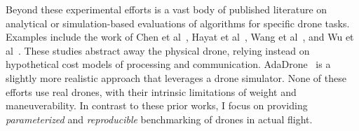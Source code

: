 Beyond these experimental efforts is a vast body of published
literature on analytical or simulation-based evaluations of algorithms
for specific drone tasks.  Examples include the work of Chen et
al~\cite{Chen2020}, Hayat et al~\cite{Hayat2021}, Wang et
al~\cite{Wang2020}, and Wu et al~\cite{Wu2020}.  These studies
abstract away the physical drone, relying instead on hypothetical cost
models of processing and communication.  AdaDrone~\cite{Chen2022} is a
slightly more realistic approach that leverages a drone simulator.
None of these efforts use real drones, with their intrinsic
limitations of weight and maneuverability.  In contrast to these prior
works, I focus on providing
\textit{parameterized} and \textit{reproducible} benchmarking of
drones in actual flight.








